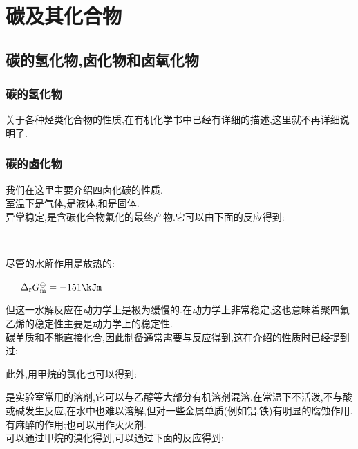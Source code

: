 \documentclass{ctexart}
\begin{document}
\section{碳及其化合物}
\subsection{碳的氢化物,卤化物和卤氧化物}
\subsubsection{碳的氢化物}
关于各种烃类化合物的性质,在有机化学书中已经有详细的描述,这里就不再详细说明了.
\subsubsection{碳的卤化物}
我们在这里主要介绍四卤化碳的性质.\\
\indent 室温下是气体,是液体,和是固体.\\
\indent {}异常稳定,是含碳化合物氟化的最终产物.它可以由下面的反应得到:
\begin{center}
    \\
\end{center}
尽管的水解作用是放热的:
\begin{center}
    \ \ \ $\Delta_\text rG_\text m^\ominus=-151\kJm$
\end{center}
但这一水解反应在动力学上是极为缓慢的.在动力学上非常稳定,这也意味着聚四氟乙烯的稳定性主要是动力学上的稳定性.\\
\indent 碳单质和不能直接化合,因此制备通常需要与反应得到,这在介绍的性质时已经提到过:
\begin{center}
\end{center}
此外,用甲烷的氯化也可以得到:
\begin{center}
\end{center}
是实验室常用的溶剂,它可以与乙醇等大部分有机溶剂混溶.在常温下不活泼,不与酸或碱发生反应,在水中也难以溶解,但对一些金属单质(例如铝,铁)有明显的腐蚀作用.有麻醉的作用;也可以用作灭火剂.\\
\indent {}可以通过甲烷的溴化得到,可以通过下面的反应得到:
\begin{center}
\end{center}
\end{document}
